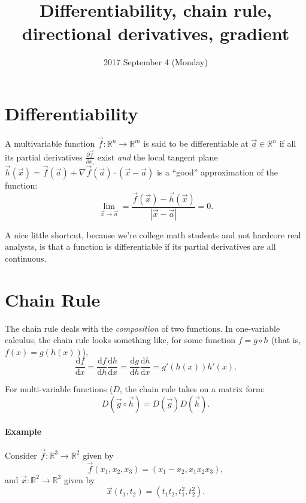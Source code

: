 \documentclass{multi}
\title{Differentiability, chain rule, directional derivatives, gradient}
\date{2017 September 4 (Monday)}
\begin{document}


\section*{Differentiability} 

A multivariable function \(\vec f\colon \mathbb R^n \to \mathbb R^m\) is said to be differentiable at \(\vec a \in \mathbb R^n\) if all its partial derivatives \(\frac{\partial \vec f}{\partial x_i}\) exist \emph{and} the local tangent plane \(\vec h(\vec x) = \vec f(\vec a) + \nabla \vec f(\vec a) \cdot (\vec x - \vec a)\) is a ``good'' approximation of the function:
\[
    \lim_{\vec x \to \vec a} = \frac{\vec f(\vec x) - \vec h(\vec x)}{|\vec x - \vec a|} = 0.
\]

A nice little shortcut, because we're college math students and not hardcore real analysts, is that a function is differentiable if its partial derivatives are all continuous.

\section*{Chain Rule}

The chain rule deals with the \emph{composition} of two functions. In one-variable calculus, the chain rule looks something like, for some function \(f = g \circ h\) (that is, \(f(x) = g(h(x))\)),
\[
    \frac{\mathrm df}{\mathrm dx} = \frac{\mathrm df}{\mathrm dh} \frac{\mathrm dh}{\mathrm dx} = \frac{\mathrm dg}{\mathrm dh} \frac{\mathrm dh}{\mathrm dx} = g'(h(x)) h'(x).
\]

For multi-variable functions (\(D\), the chain rule takes on a matrix form:
\[
    D (\vec g \circ \vec h) = D (\vec g) D (\vec h).
\]

\paragraph{Example}

Consider \(\vec f\colon \mathbb R^3 \to \mathbb R^2\) given by 
\[
    \vec f(x_1, x_2, x_3) = (x_1 - x_2, x_1 x_2 x_3),
\]
and \(\vec x\colon \mathbb R^2 \to \mathbb R^3\) given by
\[
    \vec x(t_1, t_2) = (t_1 t_2, t_1^2, t_2^2).
\]
\end{document}
